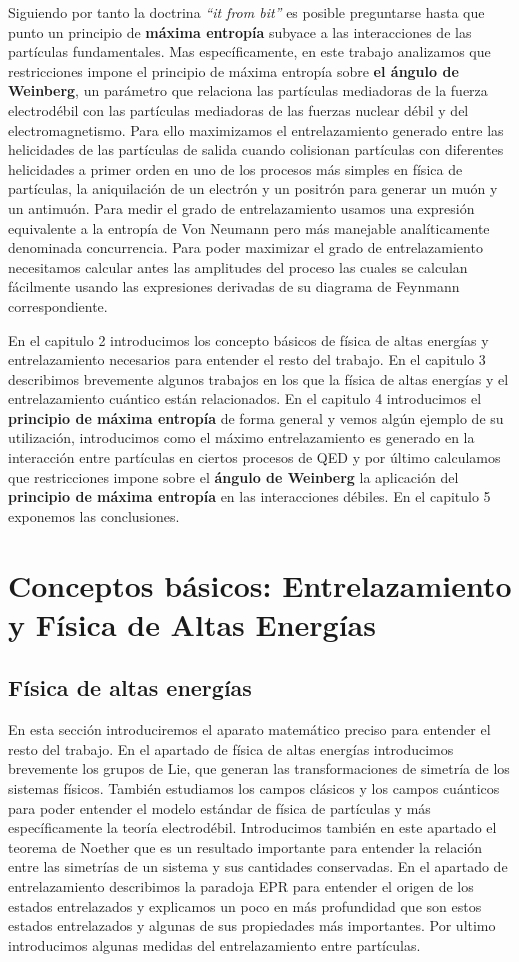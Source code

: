 \documentclass{article}
\theoremstyle{plain}
\theoremstyle{definition}
\begin{document}
	Siguiendo por tanto la doctrina \textit{``it from bit''} es posible preguntarse hasta que punto un principio de \textbf{máxima entropía} subyace a las interacciones de las partículas fundamentales. Mas específicamente, en este trabajo analizamos que restricciones impone el principio de máxima entropía sobre \textbf{el ángulo de Weinberg}, un parámetro que relaciona las partículas mediadoras de la fuerza electrodébil con las partículas mediadoras de las fuerzas nuclear débil y del electromagnetismo. Para ello maximizamos el entrelazamiento generado entre las helicidades de las partículas de salida cuando colisionan partículas con diferentes helicidades a primer orden en uno de los procesos más simples en física de partículas, 
	la aniquilación de un electrón y un positrón para generar un muón y un antimuón. 
	Para medir el grado de entrelazamiento usamos una expresión equivalente a la entropía de Von Neumann pero más manejable analíticamente denominada concurrencia. Para poder maximizar el grado de entrelazamiento necesitamos calcular antes las amplitudes del proceso las cuales se calculan fácilmente usando las expresiones derivadas de su diagrama de Feynmann correspondiente.\par
	En el capitulo 2 introducimos los concepto básicos de física de altas energías y entrelazamiento necesarios para entender el resto del trabajo. En el capitulo 3 describimos brevemente algunos trabajos en los que la física de altas energías y el entrelazamiento cuántico están relacionados. En el capitulo 4 introducimos el \textbf{principio de máxima entropía} de forma general y vemos algún ejemplo de su utilización, introducimos como el máximo entrelazamiento es generado en la interacción entre partículas en ciertos procesos de QED y por último calculamos que restricciones impone sobre el \textbf{ángulo de Weinberg} la aplicación del \textbf{principio de máxima entropía} en las interacciones débiles. En el capitulo 5 exponemos las conclusiones.
	\section{Conceptos básicos: Entrelazamiento y Física de Altas Energías}
	
	\subsection{Física de altas energías}
	En esta sección introduciremos el aparato matemático preciso para entender el resto del trabajo. En el apartado de física de altas energías introducimos brevemente los grupos de Lie, que generan las transformaciones de simetría de los sistemas físicos. También estudiamos los campos clásicos y los campos cuánticos para poder entender el modelo estándar de física de partículas y más específicamente la teoría electrodébil. Introducimos también en este apartado el teorema de Noether que es un resultado importante para entender la relación entre las simetrías de un sistema y sus cantidades conservadas. En el apartado de entrelazamiento describimos la paradoja EPR para entender el origen de los estados entrelazados y explicamos un poco en más profundidad que son estos estados entrelazados y algunas de sus propiedades más importantes. Por ultimo introducimos algunas medidas del entrelazamiento entre partículas.
\end{document}
